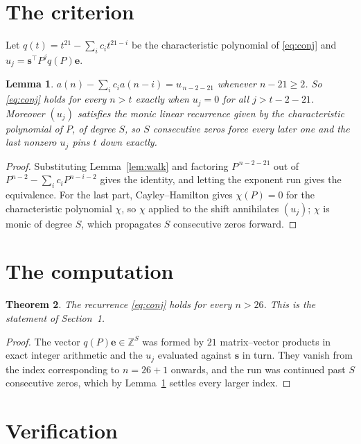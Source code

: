 \documentclass[11pt,a4paper]{article}
\theoremstyle{plain}
\newtheorem{theorem}{Theorem}
\newtheorem{lemma}[theorem]{Lemma}
\theoremstyle{definition}
\begin{document}
\section{The criterion}

Let $q(t)=t^{21}-\sum_i c_i t^{21-i}$ be the characteristic polynomial of
\eqref{eq:conj} and $u_j=\mathbf{s}^{\!\top}P^{j}q(P)\mathbf{e}$.

\begin{lemma}\label{lem:crit}
$a(n)-\sum_i c_i a(n-i)=u_{\,n-2-21}$ whenever $n-21\ge2$. So \eqref{eq:conj}
holds for every $n>t$ exactly when $u_j=0$ for all $j>t-2-21$. Moreover $(u_j)$
satisfies the monic linear recurrence given by the characteristic polynomial of $P$, of
degree $S$, so $S$ consecutive zeros force every later one and the last nonzero $u_j$ pins
$t$ down exactly.
\end{lemma}

\begin{proof}
Substituting Lemma~\ref{lem:walk} and factoring $P^{\,n-2-21}$ out of
$P^{n-2}-\sum_i c_i P^{n-i-2}$ gives the identity, and letting the exponent run gives the
equivalence. For the last part, Cayley--Hamilton gives $\chi(P)=0$ for the characteristic
polynomial $\chi$, so $\chi$ applied to the shift annihilates $(u_j)$; $\chi$ is monic of
degree $S$, which propagates $S$ consecutive zeros forward.
\end{proof}

\section{The computation}

\begin{theorem}
The recurrence \eqref{eq:conj} holds for every $n>26$. This is the statement of
Section~1.
\end{theorem}

\begin{proof}
The vector $q(P)\mathbf{e}\in\mathbb{Z}^{S}$ was formed by $21$ matrix--vector
products in exact integer arithmetic and the $u_j$ evaluated against $\mathbf{s}$ in turn.
They vanish from the index corresponding to $n=26+1$ onwards, and the run was continued
past $S$ consecutive zeros, which by Lemma~\ref{lem:crit} settles every larger index.
\end{proof}

\section{Verification}
\end{document}
